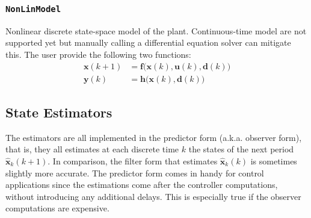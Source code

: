 \subsubsection{\texttt{NonLinModel}}

Nonlinear discrete state-space model of the plant. Continuous-time model are not supported yet but manually calling a differential equation solver can mitigate this. The user provide the following two functions:
\begin{subequations}
\begin{align}
    \mathbf{x}(k+1) &= \mathbf{f}\big(\mathbf{x}(k), \mathbf{u}(k), \mathbf{d}(k)\big) \\
    \mathbf{y}(k)   &= \mathbf{h}\big( \mathbf{x}(k), \mathbf{d}(k) \big)
\end{align}
\end{subequations}


\subsection{State Estimators}

The estimators are all implemented in the predictor form (a.k.a. observer form), that is, they all estimates at each discrete time $k$ the states of the next period $\mathbf{\hat{x}}_k(k+1)$. In comparison, the filter form that estimates $\mathbf{\hat{x}}_k(k)$ is sometimes slightly more accurate. The predictor form comes in handy for control applications since the estimations come after the controller computations, without introducing any additional delays. This is especially true if the observer computations are expensive.

